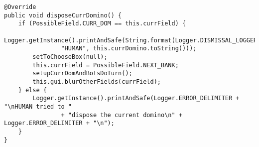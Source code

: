 \begin{lstlisting}[float,style=CodeHighlighting,caption=Game - disposeCurrDomino,label=lst:game_disposeCurrDomino]
@Override
public void disposeCurrDomino() {
    if (PossibleField.CURR_DOM == this.currField) {
        Logger.getInstance().printAndSafe(String.format(Logger.DISMISSAL_LOGGER_FORMAT, 
        		"HUMAN", this.currDomino.toString()));
        setToChooseBox(null);
        this.currField = PossibleField.NEXT_BANK;
        setupCurrDomAndBotsDoTurn();
        this.gui.blurOtherFields(currField);
    } else {
        Logger.getInstance().printAndSafe(Logger.ERROR_DELIMITER + "\nHUMAN tried to "
        		+ "dispose the current domino\n" + Logger.ERROR_DELIMITER + "\n");
    }
}
\end{lstlisting}